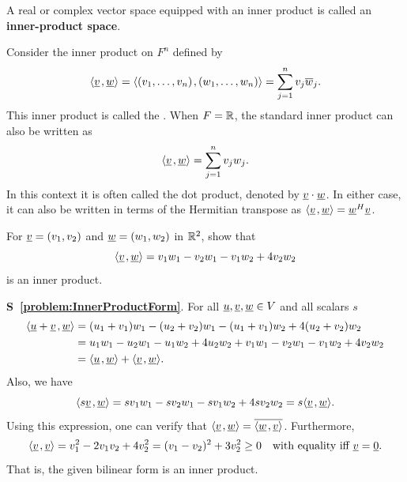 \begin{definition}
A real or complex vector space equipped with an inner product is called an \textbf{inner-product space}.
\end{definition}

\begin{example} \label{example:StandardInnerProduct}
Consider the inner product on $F^n$ defined by
\begin{equation*}
{\left\langle  \underline{v}  \mskip2mu ,  \underline{w}  \right\rangle}
= {\left\langle  (v_1, \ldots, v_n)  \mskip2mu ,  (w_1, \ldots, w_n)  \right\rangle}
= \sum_{j=1}^n v_j \overline{w}_j.
\end{equation*}
This inner product is called the .
When $F = \mathbb{R}$, the standard inner product can also be written as
\begin{equation*}
{\left\langle  \underline{v}  \mskip2mu ,  \underline{w}  \right\rangle}
= \sum_{j=1}^n v_j w_j.
\end{equation*}
In this context it is often called the dot product, denoted by $\underline{v} \cdot \underline{w}$.
In either case, it can also be written in terms of the Hermitian transpose as $ {\left\langle  \underline{v}  \mskip2mu ,  \underline{w}  \right\rangle} = \underline{w}^H \underline{v} $.

\end{example}

\begin{problem} \label{problem:InnerProductForm}
For $\underline{v} = (v_1, v_2)$ and $\underline{w} = (w_1, w_2)$  in $\mathbb{R}^2$, show that
\begin{equation*}
{\left\langle  \underline{v}  \mskip2mu ,  \underline{w}  \right\rangle}
= v_1 w_1 - v_2 w_1 - v_1 w_2 + 4 v_2 w_2
\end{equation*}
is an inner product.
\end{problem}
\noindent \textbf{S~\ref{problem:InnerProductForm}}.
For all $\underline{u}, \underline{v}, \underline{w} \in V$ and all scalars $s$
\begin{equation*}
\begin{split}
{\left\langle  \underline{u} + \underline{v}  \mskip2mu ,  \underline{w}  \right\rangle}
&= (u_1 + v_1) w_1 - (u_2 + v_2) w_1 - (u_1 + v_1) w_2 + 4 (u_2 + v_2) w_2 \\
&= u_1 w_1 - u_2 w_1 - u_1 w_2 + 4 u_2 w_2
+ v_1 w_1 - v_2 w_1 - v_1 w_2 + 4 v_2 w_2 \\
&= {\left\langle  \underline{u}  \mskip2mu ,  \underline{w}  \right\rangle}
+ {\left\langle  \underline{v}  \mskip2mu ,  \underline{w}  \right\rangle}.
\end{split}
\end{equation*}
Also, we have
\begin{equation*}
{\left\langle  s \underline{v}  \mskip2mu ,  \underline{w}  \right\rangle}
= s v_1 w_1 - s v_2 w_1 - s v_1 w_2 + 4 s v_2 w_2
= s {\left\langle  \underline{v}  \mskip2mu ,  \underline{w}  \right\rangle}.
\end{equation*}
Using this expression, one can verify that ${\left\langle  \underline{v}  \mskip2mu ,  \underline{w}  \right\rangle} = \overline{ {\left\langle  \underline{w}  \mskip2mu ,  \underline{v}  \right\rangle} }$.
Furthermore,
\begin{equation*}
{\left\langle  \underline{v}  \mskip2mu ,  \underline{v}  \right\rangle}
= v_1^2 - 2 v_1 v_2 + 4 v_2^2
= ( v_1 - v_2 )^2 + 3 v_2^2
\geq 0
\quad \text{with equality iff } \underline{v} = \underline{0}.
\end{equation*}
That is, the given bilinear form is an inner product.


